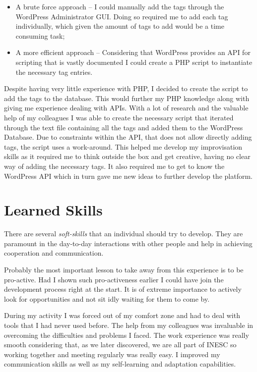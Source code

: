 \documentclass[a4paper,12pt,journal,twoside,compsoc]{PPIEEEtran}
\begin{document}
\begin{itemize}
	\item A brute force approach -- I could manually add the tags through the WordPress Administrator \ac{GUI}. Doing so required me to add each tag individually, which given the amount of tags to add would be a time consuming task;
	\item A more efficient approach -- Considering that WordPress provides an API for scripting that is vastly documented I could create a PHP script to instantiate the necessary tag entries.
\end{itemize}

Despite having very little experience with PHP, I decided to create the script to add the tags to the database. This would further my PHP knowledge along with giving me experience dealing with APIs. With a lot of research and the valuable help of my colleagues I was able to create the necessary script that iterated through the text file containing all the tags and added them to the WordPress Database. Due to constraints within the API, that does not allow directly adding tags, the script uses a work-around. This helped me develop my improvisation skills as it required me to think outside the box and get creative, having no clear way of adding the necessary tags.  It also required me to get to know the WordPress API which in turn gave me new ideas to further develop the platform.

\section{Learned Skills}
There are several \textit{soft-skills} that an individual should try to develop. They are paramount in the day-to-day interactions with other people and help in achieving cooperation and communication. 

Probably the most important lesson to take away from this experience is to be pro-active. Had I shown such pro-activeness earlier I could have join the development process right at the start. It is of extreme importance to actively look for opportunities and not sit idly waiting for them to come by.

During my activity I was forced out of my comfort zone and had to deal with tools that I had never used before. The help from my colleagues was invaluable in overcoming the difficulties and problems I faced. The work experience was really smooth considering that, as we later discovered, we are all part of \ac{INESC} so working together and meeting regularly was really easy. I improved my communication skills as well as my self-learning and adaptation capabilities. 
\end{document}
